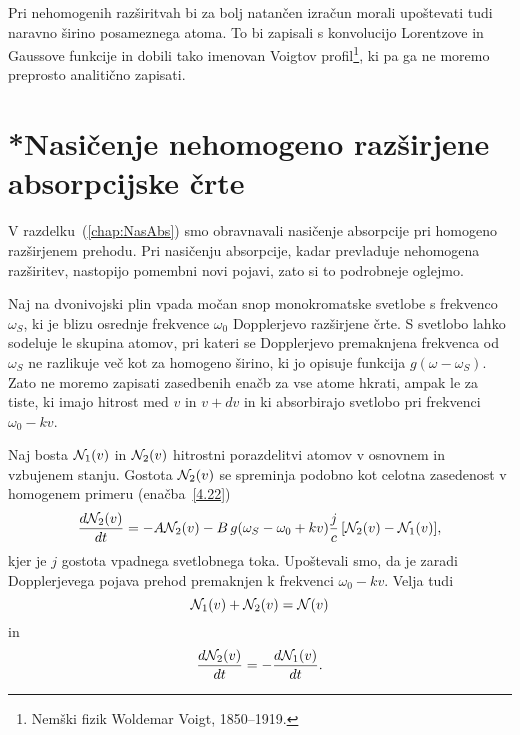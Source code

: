\begin{remark}
Pri nehomogenih razširitvah bi za bolj natančen izračun morali upoštevati 
tudi naravno širino posameznega atoma. To bi zapisali s konvolucijo Lorentzove
in Gaussove funkcije in dobili tako imenovan Voigtov 
profil\footnote{Nemški fizik Woldemar Voigt, 1850--1919.}, ki pa ga ne moremo 
preprosto analitično zapisati.
\end{remark}

\section{*Nasičenje nehomogeno razširjene absorpcijske črte}
V razdelku~(\ref{chap:NasAbs}) smo obravnavali nasičenje absorpcije pri homogeno 
razširjenem prehodu. Pri nasičenju absorpcije, kadar prevladuje nehomogena razširitev,
nastopijo pomembni novi pojavi, zato si to podrobneje oglejmo.

Naj na dvonivojski plin 
vpada močan snop monokromatske svetlobe s frekvenco $\omega_S$,
ki je blizu osrednje frekvence $\omega_{0}$ Dopplerjevo razširjene 
črte. S svetlobo
lahko sodeluje le skupina atomov, pri kateri se Dopplerjevo premaknjena
frekvenca od $\omega_S$ ne razlikuje več kot za homogeno širino, ki
jo opisuje funkcija $g(\omega-\omega_S)$. Zato ne moremo zapisati zasedbenih
enačb za vse atome hkrati, ampak le za tiste, ki imajo hitrost med
$v$ in $v+dv$ in ki absorbirajo svetlobo pri frekvenci $\omega_{0}-kv$.

Naj bosta ${\cal N}_{1}(v)$ in ${\cal N}_{2}(v)$ hitrostni porazdelitvi
atomov v osnovnem in vzbujenem stanju. Gostota
${\cal N}_{2}(v)$ se spreminja podobno kot celotna
zasedenost v homogenem primeru (enačba~\ref{4.22})
\begin{equation}
\frac{d{\cal N}_{2}(v)}{dt}=-A{\cal N}_{2}(v) -B\, g(\omega_S-\omega_{0}+kv)
\frac{j}{c}\,
[{\cal N}_{2}(v)-{\cal N}_{1}(v)],
\label{4.85}
\end{equation}
 kjer je $j$ gostota vpadnega svetlobnega toka. Upoštevali
smo, da je zaradi Dopplerjevega pojava prehod premaknjen k frekvenci
$\omega_{0}-kv$. Velja tudi
\begin{equation}
{\cal N}_{1}(v)+{\cal N}_{2}(v)={\cal N}(v)
\end{equation}
in 
\begin{equation}
 \frac{d{\cal N}_{2}(v)}{dt}=-\frac{d{\cal N}_{1}(v)}{dt}.
\label{4.86}
\end{equation}

